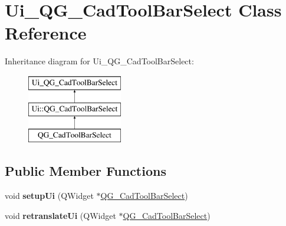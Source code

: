 \hypertarget{classUi__QG__CadToolBarSelect}{\section{Ui\-\_\-\-Q\-G\-\_\-\-Cad\-Tool\-Bar\-Select Class Reference}
\label{classUi__QG__CadToolBarSelect}
}
Inheritance diagram for Ui\-\_\-\-Q\-G\-\_\-\-Cad\-Tool\-Bar\-Select\-:\begin{figure}[H]
\begin{center}
\leavevmode
\includegraphics[height=3.000000cm]{classUi__QG__CadToolBarSelect}
\end{center}
\end{figure}
\subsection*{Public Member Functions}
\begin{DoxyCompactItemize}
\item 
\hypertarget{classUi__QG__CadToolBarSelect_a36375c622cae74ed4d25e28ff6d7ea08}{void {\bfseries setup\-Ui} (Q\-Widget $\ast$\hyperlink{classQG__CadToolBarSelect}{Q\-G\-\_\-\-Cad\-Tool\-Bar\-Select})}\label{classUi__QG__CadToolBarSelect_a36375c622cae74ed4d25e28ff6d7ea08}

\item 
\hypertarget{classUi__QG__CadToolBarSelect_af1e6233b573878f9c4d7bf041b8a344d}{void {\bfseries retranslate\-Ui} (Q\-Widget $\ast$\hyperlink{classQG__CadToolBarSelect}{Q\-G\-\_\-\-Cad\-Tool\-Bar\-Select})}\label{classUi__QG__CadToolBarSelect_af1e6233b573878f9c4d7bf041b8a344d}

\end{DoxyCompactItemize}
